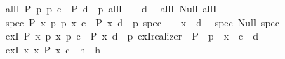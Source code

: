 \begin{isabellebody}
\isanewline
\ \ allI\ {\isacharparenleft}{\kern0pt}P{\isacharparenright}{\kern0pt}{\isacharcolon}{\kern0pt}\ {\isachardoublequoteopen}{\isasymlambda}p{\isachardot}{\kern0pt}\ p{\isachardoublequoteclose}\ {\isachardoublequoteopen}\isactrlbold {\isasymlambda}{\isacharparenleft}{\kern0pt}c{\isacharcolon}{\kern0pt}\ {\isacharunderscore}{\kern0pt}{\isacharparenright}{\kern0pt}\ P\ {\isacharparenleft}{\kern0pt}d{\isacharcolon}{\kern0pt}\ {\isacharunderscore}{\kern0pt}{\isacharparenright}{\kern0pt}\ p{\isachardot}{\kern0pt}\ allI\ {\isasymcdot}\ {\isacharunderscore}{\kern0pt}\ {\isasymbullet}\ d{\isachardoublequoteclose}\isanewline
\isanewline
\ \ allI{\isacharcolon}{\kern0pt}\ {\isachardoublequoteopen}Null{\isachardoublequoteclose}\ {\isachardoublequoteopen}allI{\isachardoublequoteclose}\isanewline
\isanewline
\ \ spec\ {\isacharparenleft}{\kern0pt}P{\isacharparenright}{\kern0pt}{\isacharcolon}{\kern0pt}\ {\isachardoublequoteopen}{\isasymlambda}x\ p{\isachardot}{\kern0pt}\ p\ x{\isachardoublequoteclose}\ {\isachardoublequoteopen}\isactrlbold {\isasymlambda}{\isacharparenleft}{\kern0pt}c{\isacharcolon}{\kern0pt}\ {\isacharunderscore}{\kern0pt}{\isacharparenright}{\kern0pt}\ P\ x\ {\isacharparenleft}{\kern0pt}d{\isacharcolon}{\kern0pt}\ {\isacharunderscore}{\kern0pt}{\isacharparenright}{\kern0pt}\ p{\isachardot}{\kern0pt}\ spec\ {\isasymcdot}\ {\isacharunderscore}{\kern0pt}\ {\isasymcdot}\ x\ {\isasymbullet}\ d{\isachardoublequoteclose}\isanewline
\isanewline
\ \ spec{\isacharcolon}{\kern0pt}\ {\isachardoublequoteopen}Null{\isachardoublequoteclose}\ {\isachardoublequoteopen}spec{\isachardoublequoteclose}\isanewline
\isanewline
\ \ exI\ {\isacharparenleft}{\kern0pt}P{\isacharparenright}{\kern0pt}{\isacharcolon}{\kern0pt}\ {\isachardoublequoteopen}{\isasymlambda}x\ p{\isachardot}{\kern0pt}\ {\isacharparenleft}{\kern0pt}x{\isacharcomma}{\kern0pt}\ p{\isacharparenright}{\kern0pt}{\isachardoublequoteclose}\ {\isachardoublequoteopen}\isactrlbold {\isasymlambda}{\isacharparenleft}{\kern0pt}c{\isacharcolon}{\kern0pt}\ {\isacharunderscore}{\kern0pt}{\isacharparenright}{\kern0pt}\ P\ x\ {\isacharparenleft}{\kern0pt}d{\isacharcolon}{\kern0pt}\ {\isacharunderscore}{\kern0pt}{\isacharparenright}{\kern0pt}\ p{\isachardot}{\kern0pt}\ exI{\isacharunderscore}{\kern0pt}realizer\ {\isasymcdot}\ P\ {\isasymcdot}\ p\ {\isasymcdot}\ x\ {\isasymbullet}\ c\ {\isasymbullet}\ d{\isachardoublequoteclose}\isanewline
\isanewline
\ \ exI{\isacharcolon}{\kern0pt}\ {\isachardoublequoteopen}{\isasymlambda}x{\isachardot}{\kern0pt}\ x{\isachardoublequoteclose}\ {\isachardoublequoteopen}\isactrlbold {\isasymlambda}P\ x\ {\isacharparenleft}{\kern0pt}c{\isacharcolon}{\kern0pt}\ {\isacharunderscore}{\kern0pt}{\isacharparenright}{\kern0pt}\ {\isacharparenleft}{\kern0pt}h{\isacharcolon}{\kern0pt}\ {\isacharunderscore}{\kern0pt}{\isacharparenright}{\kern0pt}{\isachardot}{\kern0pt}\ h{\isachardoublequoteclose}\isanewline

\end{isabellebody}

